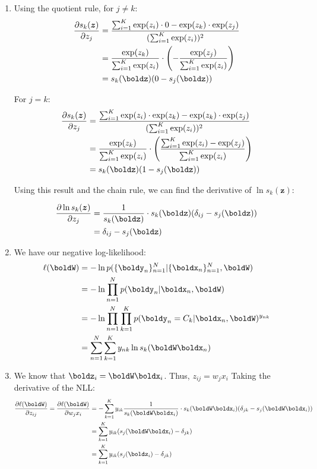 \documentclass[submit]{harvardml}
\begin{document}
\begin{enumerate}
\item 
Using the quotient rule, for $j \neq k$:
\begin{align*}
    \frac{\partial s_k(\bm{z})}{\partial z_j} &= \frac{\sum^K_{i=1}\exp(z_i) \cdot 0 - \exp(z_k)\cdot\exp(z_j)}{(\sum_{i=1}^K \exp(z_i))^2}\\
    &= \frac{\exp(z_k)}{\sum_{i=1}^K \exp(z_i)} \cdot \left(- \frac{\exp(z_j)}{\sum_{i=1}^K \exp(z_i)}\right)\\
    &= s_k(\boldz)(0 - s_j(\boldz))
\end{align*}

For $j=k$:
\begin{align*}
    \frac{\partial s_k(\bm{z})}{\partial z_j} &= \frac{\sum^K_{i=1}\exp(z_i) \cdot \exp(z_k) - \exp(z_k)\cdot\exp(z_j)}{(\sum_{i=1}^K \exp(z_i))^2}\\
    &= \frac{\exp(z_k)}{\sum_{i=1}^K \exp(z_i)} \cdot \left(\frac{\sum^K_{i=1}\exp(z_i) - \exp(z_j)}{\sum_{i=1}^K \exp(z_i)}\right)\\
    &= s_k(\boldz)(1 - s_j(\boldz))
\end{align*}

Using this result and the chain rule, we can find the derivative of $\ln s_k(\bm{z})$:

\begin{align*}
    \frac{\partial \ln s_k(\bm{z})}{\partial z_j} &= \frac{1}{s_k(\boldz)} \cdot s_k(\boldz)(\delta_{ij} - s_j(\boldz))\\
    &= \delta_{ij} - s_j(\boldz)
\end{align*}

\item
We have our negative log-likelihood:
\begin{align*}
    \ell(\boldW) &= -\ln p(\{\boldy_n\}_{n=1}^N | \{\boldx_n\}_{n=1}^N, \boldW)\\
    &= -\ln \prod_{n=1}^N p(\boldy_n | \boldx_n, \boldW)\\
    &= -\ln \prod_{n=1}^N \prod_{k=1}^K p(\boldy_n = C_k | \boldx_n, \boldW)^{y_{nk}}\\
    &= \sum_{n=1}^N \sum_{k=1}^K y_{nk} \ln s_k(\boldW\boldx_n) 
\end{align*}


\item 
We know that $\boldz_i = \boldW \boldx_i$. Thus, $z_{ij} = w_j x_i$ Taking the derivative of the NLL:
\begin{align*}
    \frac{\partial\ell(\boldW)}{\partial z_{ij}} = \frac{\partial\ell(\boldW)}{\partial w_j x_i} &= -\sum_{k=1}^K y_{ik} \frac{1}{s_k(\boldW\boldx_i)} \cdot s_k(\boldW\boldx_i)(\delta_{jk} - s_j(\boldW\boldx_i))\\
    &= \sum_{k=1}^K y_{ik} (s_j(\boldW\boldx_i) - \delta_{jk})\\
    &= \sum_{k=1}^K y_{ik} (s_j(\boldz_i) - \delta_{jk})\\
\end{align*}


\end{enumerate}
\end{document}
